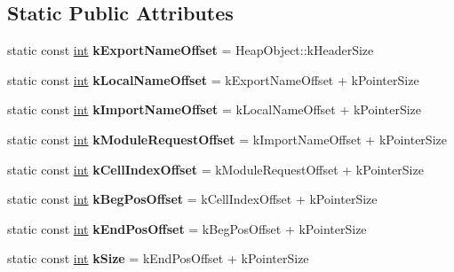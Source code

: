 \subsection*{Static Public Attributes}
\begin{DoxyCompactItemize}
\item 
\mbox{\label{classv8_1_1internal_1_1ModuleInfoEntry_a921b3befc5c88aae0b5cc27b0d53acb7}} 
static const \mbox{\hyperlink{classint}{int}} {\bfseries k\+Export\+Name\+Offset} = Heap\+Object\+::k\+Header\+Size
\item 
\mbox{\label{classv8_1_1internal_1_1ModuleInfoEntry_acf91020c74592f2086a035b04ca8129c}} 
static const \mbox{\hyperlink{classint}{int}} {\bfseries k\+Local\+Name\+Offset} = k\+Export\+Name\+Offset + k\+Pointer\+Size
\item 
\mbox{\label{classv8_1_1internal_1_1ModuleInfoEntry_ab2db1479815b2411afbe77508a11a83a}} 
static const \mbox{\hyperlink{classint}{int}} {\bfseries k\+Import\+Name\+Offset} = k\+Local\+Name\+Offset + k\+Pointer\+Size
\item 
\mbox{\label{classv8_1_1internal_1_1ModuleInfoEntry_ab8e7db60199395c50709f22dcf4b3925}} 
static const \mbox{\hyperlink{classint}{int}} {\bfseries k\+Module\+Request\+Offset} = k\+Import\+Name\+Offset + k\+Pointer\+Size
\item 
\mbox{\label{classv8_1_1internal_1_1ModuleInfoEntry_a21a94e079734d2a79c80c6dbfbb4188f}} 
static const \mbox{\hyperlink{classint}{int}} {\bfseries k\+Cell\+Index\+Offset} = k\+Module\+Request\+Offset + k\+Pointer\+Size
\item 
\mbox{\label{classv8_1_1internal_1_1ModuleInfoEntry_a4bcb836ad80d25bcc49925d017b4375c}} 
static const \mbox{\hyperlink{classint}{int}} {\bfseries k\+Beg\+Pos\+Offset} = k\+Cell\+Index\+Offset + k\+Pointer\+Size
\item 
\mbox{\label{classv8_1_1internal_1_1ModuleInfoEntry_a64fcf7a6a18134150a0f53d92ae20001}} 
static const \mbox{\hyperlink{classint}{int}} {\bfseries k\+End\+Pos\+Offset} = k\+Beg\+Pos\+Offset + k\+Pointer\+Size
\item 
\mbox{\label{classv8_1_1internal_1_1ModuleInfoEntry_aa45b004071e1869d9ae6489c0009a929}} 
static const \mbox{\hyperlink{classint}{int}} {\bfseries k\+Size} = k\+End\+Pos\+Offset + k\+Pointer\+Size
\end{DoxyCompactItemize}
